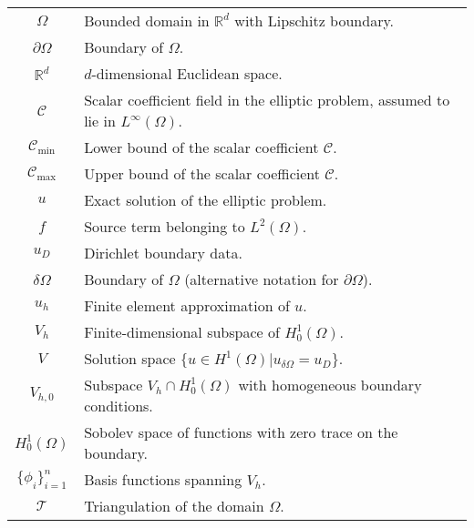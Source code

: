 \begin{longtable}{c p{10cm}}
    $\Omega$               & Bounded domain in $\mathbb{R}^d$ with Lipschitz boundary.                               \\
    $\partial \Omega$      & Boundary of $\Omega$.                                                                   \\
    $\mathbb{R}^d$         & $d$-dimensional Euclidean space.                                                        \\
    $\mathcal{C}$          & Scalar coefficient field in the elliptic problem, assumed to lie in $L^\infty(\Omega)$. \\
    $\mathcal{C}_{\min}$   & Lower bound of the scalar coefficient $\mathcal{C}$.                                    \\
    $\mathcal{C}_{\max}$   & Upper bound of the scalar coefficient $\mathcal{C}$.                                    \\
    $u$                    & Exact solution of the elliptic problem.                                                 \\
    $f$                    & Source term belonging to $L^2(\Omega)$.                                                 \\
    $u_D$                  & Dirichlet boundary data.                                                                \\
    $\delta\Omega$         & Boundary of $\Omega$ (alternative notation for $\partial \Omega$).                      \\
    $u_h$                  & Finite element approximation of $u$.                                                    \\
    $V_h$                  & Finite-dimensional subspace of $H_0^1(\Omega)$.                                         \\
    $V$                    & Solution space $\{u\in H^1(\Omega) | u_{\delta \Omega} = u_D\}$.                        \\
    $V_{h,0}$              & Subspace $V_h\cap H^1_0(\Omega)$ with homogeneous boundary conditions.                  \\
    $H^1_0(\Omega)$        & Sobolev space of functions with zero trace on the boundary.                             \\
    $\{\phi_i\}_{i=1}^{n}$ & Basis functions spanning $V_h$.                                                         \\
    $\mathcal{T}$          & Triangulation of the domain $\Omega$.                                                   \\

\end{longtable}
